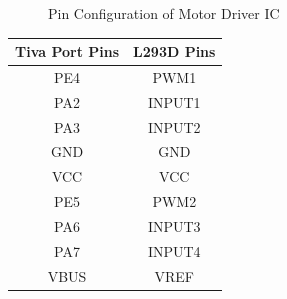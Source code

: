 \documentclass[a4paper,12pt,oneside]{book}
\begin{document}
\begin {enumerate}
\begin{figure}[h]
	\caption{Pin Configuration of Motor Driver IC}
\end{figure}
\begin{center}
	\begin{tabular}{| c | c |}
		\hline
		\textbf{Tiva Port Pins} & \textbf{L293D Pins}\\
		\hline
		PE4 & PWM1\\
		\hline
		PA2 & INPUT1\\
		\hline
		PA3 & INPUT2 \\
		\hline
		GND & GND\\
		\hline
		VCC & VCC \\
		\hline
		PE5 & PWM2 \\
		\hline
		PA6 & INPUT3\\
		\hline
		PA7 & INPUT4 \\
		\hline
		VBUS & VREF \\
		\hline
	\end{tabular}
\end{center}


\end{enumerate}
\end{document}
